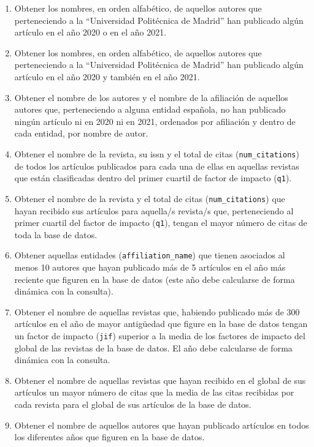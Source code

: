 \documentclass{db-practice}
\begin{document}
\begin{enumerate}
    \item Obtener los nombres, en orden alfabético, de aquellos autores que perteneciendo a la ``Universidad Politécnica de Madrid'' han publicado algún artículo en el año 2020 o en el año 2021.
    \item Obtener los nombres, en orden alfabético, de aquellos autores que perteneciendo a la ``Universidad Politécnica de Madrid'' han publicado algún artículo en el año 2020 y también en el año 2021.
    \item Obtener el nombre de los autores y el nombre de la afiliación de aquellos autores que, perteneciendo a alguna entidad española, no han publicado ningún artículo ni en 2020 ni en 2021, ordenados por afiliación y dentro de cada entidad, por nombre de autor.
    \item Obtener el nombre de la revista, su issn y el total de citas (\texttt{num\_citations}) de todos los artículos publicados para cada una de ellas en aquellas revistas que están clasificadas dentro del primer cuartil de factor de impacto (\texttt{q1}).
    \item Obtener el nombre de la revista y el total de citas (\texttt{num\_citations}) que hayan recibido sus artículos para aquella/s revista/s que, perteneciendo al primer cuartil del factor de impacto (\texttt{q1}), tengan el mayor número de citas de toda la base de datos.
    \item Obtener aquellas entidades (\texttt{affiliation\_name}) que tienen asociados al menos 10 autores que hayan publicado más de 5 artículos en el año más reciente que figuren en la base de datos (este año debe calcularse de forma dinámica con la consulta).
    \item Obtener el nombre de aquellas revistas que, habiendo publicado más de 300 artículos en el año de mayor antigüedad que figure en la base de datos tengan un factor de impacto (\texttt{jif}) superior a la media de los factores de impacto del global de las revistas de la base de datos. El año debe calcularse de forma dinámica con la consulta.
    \item Obtener el nombre de aquellas revistas que hayan recibido en el global de sus artículos un mayor número de citas que la media de las citas recibidas por cada revista para el global de sus artículos de la base de datos.
    \item Obtener el nombre de aquellos autores que hayan publicado artículos en todos los diferentes años que figuren en la base de datos.
\end{enumerate}
\end{document}
